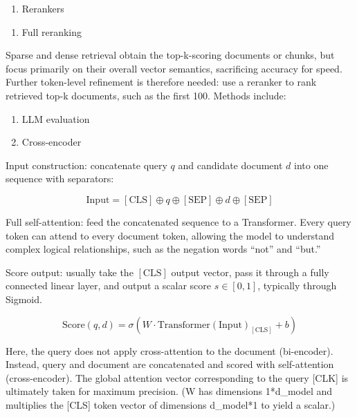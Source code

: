 \begin{enumerate}
\def\labelenumi{(\Roman{enumi})}
\tightlist
\item
  Rerankers
\end{enumerate}

\begin{enumerate}
\def\labelenumi{\arabic{enumi}.}
\tightlist
\item
  Full reranking
\end{enumerate}

Sparse and dense retrieval obtain the top-k-scoring documents or chunks, but focus primarily on their overall vector semantics, sacrificing accuracy for speed. Further token-level refinement is therefore needed: use a reranker to rank retrieved top-k documents, such as the first 100. Methods include:

\begin{enumerate}
\def\labelenumi{(\arabic{enumi})}
\item
  LLM evaluation
\item
  Cross-encoder
\end{enumerate}

Input construction: concatenate query \(q\) and candidate document \(d\) into one sequence with separators:

\[
\mathrm{Input}=[\mathrm{CLS}]\oplus q\oplus[\mathrm{SEP}]\oplus d\oplus[\mathrm{SEP}]
\]

Full self-attention: feed the concatenated sequence to a Transformer. Every query token can attend to every document token, allowing the model to understand complex logical relationships, such as the negation words ``not'' and ``but.''

Score output: usually take the \([\mathrm{CLS}]\) output vector, pass it through a fully connected linear layer, and output a scalar score \(s\in[0,1]\), typically through Sigmoid.

\[
\mathrm{Score}(q,d)=\sigma\left(W\cdot\mathrm{Transformer}(\mathrm{Input})_{[\mathrm{CLS}]}+b\right)
\]

Here, the query does not apply cross-attention to the document (bi-encoder). Instead, query and document are concatenated and scored with self-attention (cross-encoder). The global attention vector corresponding to the query {[}CLK{]} is ultimately taken for maximum precision. (W has dimensions 1*d\_model and multiplies the {[}CLS{]} token vector of dimensions d\_model*1 to yield a scalar.)

